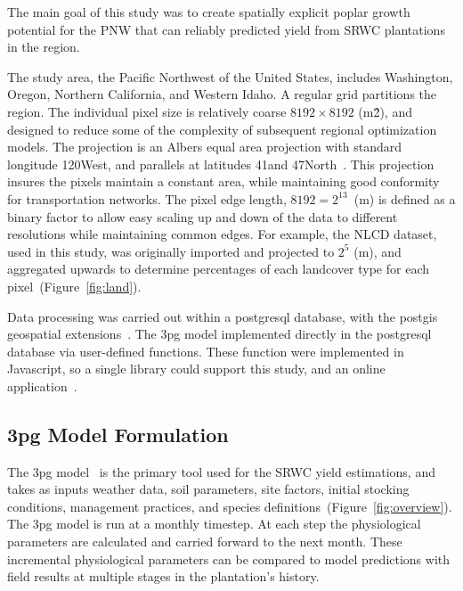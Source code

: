 \documentclass[preprint,12pt]{elsarticle}
\begin{document}
The main goal of this study was to create spatially explicit poplar
growth potential for the \ac{PNW} that can reliably predicted yield from \ac{SRWC}
plantations in the region.

The study area, the Pacific Northwest of the United States,
includes Washington, Oregon, Northern California, and Western
Idaho.  A regular grid partitions the region.  The individual pixel size is
relatively coarse $8192 \times 8192$ (m\^2), and designed to reduce
some of the complexity of subsequent regional optimization models.
The projection is an Albers equal area projection with standard
longitude 120\degree West, and parallels at latitudes 41\degree and
47\degree North~\cite{Butler}. This projection insures the pixels
maintain a constant area, while maintaining good conformity for
transportation networks.  The pixel edge length, $8192 = 2^{13}$~(m)
is defined as a binary factor to allow easy scaling up and down of the
data to different resolutions while maintaining common edges.  For
example, the \ac{NLCD} dataset, used in this study, was originally
imported and projected to $2^5$ (m), and aggregated upwards to
determine percentages of each landcover type for each
pixel~(Figure~\ref{fig:land}).

Data processing was carried out within a postgresql database, with the
postgis geospatial extensions~\cite{pgsql,Holl2009,postgis}.  The
\ac{3pg} model implemented directly in the postgresql database via
user-defined functions.  These function were implemented in
Javascript, so a single library could support this study, and an
online application~\cite{Prilepova2014}.

\subsection{\acs{3pg} Model Formulation}
\label{sec:3pg}

The \acf{3pg} model~\cite{Landsberg1997, landsberg2010physiological,
  Sands2004} is the primary tool used for the \ac{SRWC} yield
estimations, and takes as inputs weather data, soil parameters, site
factors, initial stocking conditions, management practices, and
species definitions~(Figure~\ref{fig:overview}).  The \ac{3pg} model
is run at a monthly timestep. At each step the physiological
parameters are calculated and carried forward to the next
month. 
These incremental physiological parameters
can be compared to model predictions with field results at multiple
stages in the plantation's history.
\end{document}

